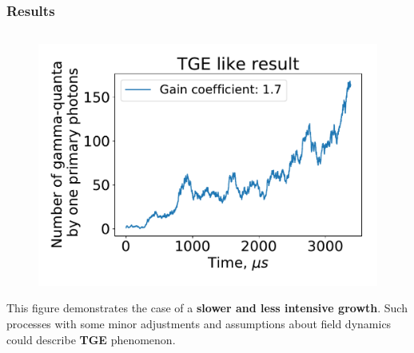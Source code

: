 \documentclass[8pt,pdf,hyperref={unicode}]{beamer}
\begin{document}
\begin{frame}
    \frametitle{Results}
    
    \begin{columns}
    	
    	\begin{column}{0.5\textwidth}
    		
    		\begin{figure}[htb]
    			\centering
    			\includegraphics[width=1\columnwidth]{proofTGE.pdf}
    		\end{figure}
    		This figure demonstrates the case of a \textbf{slower and less intensive growth}. Such processes with some minor adjustments and assumptions about field dynamics could describe \textbf{TGE} phenomenon.	
    	\end{column}
    \end{columns}

\end{frame}
\end{document}
